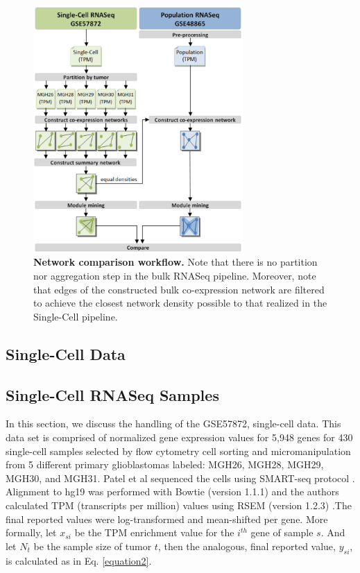 \documentclass[10pt,letterpaper]{article}
\begin{document}
\begin{figure}[h]
\centering
\includegraphics[width=80mm]{Figures/Workflow}
\caption{{\bf Network comparison workflow.} Note that there is no  partition nor aggregation step in the bulk RNASeq pipeline. Moreover, note that edges of the constructed bulk co-expression network are filtered to achieve the closest network density possible to that realized in the Single-Cell pipeline. }
\label{fig:workflow}
\end{figure}

\subsection*{Single-Cell Data}
\subsection*{Single-Cell RNASeq Samples }
In this section, we discuss the handling of the GSE57872, single-cell data. This data set is comprised of normalized gene expression values for 5,948 genes for 430 single-cell samples selected by flow cytometry cell sorting and micromanipulation from 5 different primary glioblastomas labeled: MGH26, MGH28, MGH29, MGH30, and MGH31. Patel et al sequenced the cells using SMART-seq protocol \cite{Ramskold2012}. Alignment to hg19 was performed with Bowtie (version 1.1.1) \cite{Langmead2009} and the authors calculated TPM (transcripts per million) values using RSEM (version 1.2.3) \cite{Li2011}.The final reported values were log-transformed and mean-shifted per gene. More formally, let $x_{si}$ be the TPM enrichment value for the $i^{th}$ gene of sample $s$. And let $N_{t}$ be the sample size of tumor $t$, then the analogous, final reported value, $y_{si}$, is calculated as in Eq. \ref{equation2}.
\end{document}
